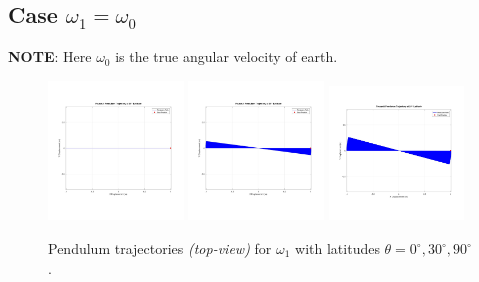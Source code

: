 \documentclass[12pt,a4paper]{article}
\begin{document}
\subsection{Case $\omega_1 = \omega_{0}$}
\textbf{NOTE}: Here $\omega_{0}$ is the true angular velocity of earth.
\begin{figure}[H]
    \centering
    \includegraphics[width=0.32\textwidth]{traj_0.jpg}
    \includegraphics[width=0.32\textwidth]{traj_30.jpg}
    \includegraphics[width=0.32\textwidth]{traj_90.jpg}
    \caption{Pendulum trajectories \textit{(top-view)} for $\omega_1$ with latitudes $\theta = 0^\circ, 30^\circ, 90^\circ$.}
\end{figure}
\end{document}
